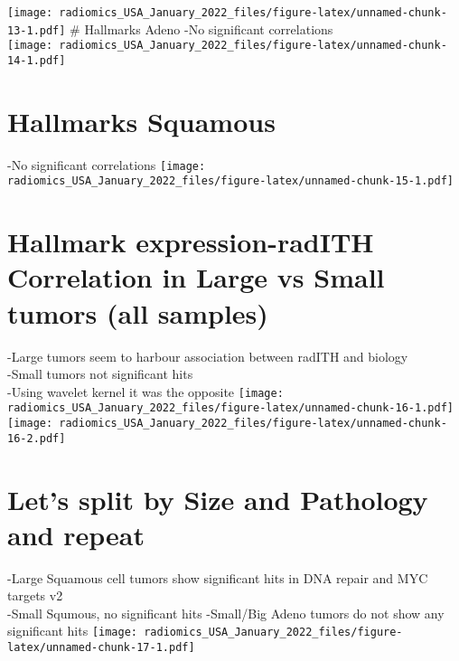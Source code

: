 \documentclass[]{article}
\begin{document}
\texttt{[image: radiomics\_USA\_January\_2022\_files/figure-latex/unnamed-chunk-13-1.pdf]}
\# Hallmarks Adeno -No significant correlations\\
\texttt{[image: radiomics\_USA\_January\_2022\_files/figure-latex/unnamed-chunk-14-1.pdf]}

\section{Hallmarks Squamous}\label{hallmarks-squamous}

-No significant correlations
\texttt{[image: radiomics\_USA\_January\_2022\_files/figure-latex/unnamed-chunk-15-1.pdf]}

\section{Hallmark expression-radITH Correlation in Large vs Small tumors
(all
samples)}\label{hallmark-expression-radith-correlation-in-large-vs-small-tumors-all-samples}

-Large tumors seem to harbour association between radITH and biology\\
-Small tumors not significant hits\\
-Using wavelet kernel it was the opposite
\texttt{[image: radiomics\_USA\_January\_2022\_files/figure-latex/unnamed-chunk-16-1.pdf]}
\texttt{[image: radiomics\_USA\_January\_2022\_files/figure-latex/unnamed-chunk-16-2.pdf]}

\section{Let's split by Size and Pathology and
repeat}\label{lets-split-by-size-and-pathology-and-repeat}

-Large Squamous cell tumors show significant hits in DNA repair and MYC
targets v2\\
-Small Squmous, no significant hits -Small/Big Adeno tumors do not show
any significant hits
\texttt{[image: radiomics\_USA\_January\_2022\_files/figure-latex/unnamed-chunk-17-1.pdf]}
\end{document}
